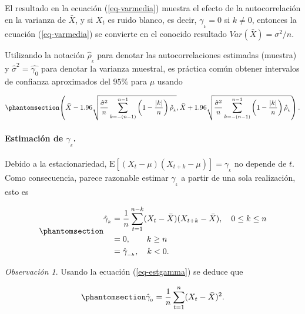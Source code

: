\documentclass[
  us-letterpaper,
]{scrreprt}
\let\oldparagraph\paragraph
\renewcommand{\paragraph}[1]{\oldparagraph{#1}\mbox{}}
\theoremstyle{plain}
\theoremstyle{definition}
\theoremstyle{definition}
\theoremstyle{plain}
\theoremstyle{remark}
\newtheorem*{remark}{Observación}
\begin{document}
El resultado en la ecuación (\ref{eq-varmedia}) muestra el efecto de la
autocorrelación en la varianza de \(\bar X\), y si \(X_t\) es ruido
blanco, es decir, \(\gamma_{_{k}} = 0\) si \(k \ne 0\), entonces la
ecuación (\ref{eq-varmedia}) se convierte en el conocido resultado
\(Var(\bar X) = \sigma^2/n\).

Utilizando la notación \(\hat \rho_{_k}\) para denotar las
autocorrelaciones estimadas (muestra) y \(\hat\sigma^2=\hat{\gamma_0}\)
para denotar la varianza muestral, es práctica común obtener intervalos
de confianza aproximados del \(95\%\) para \(\mu\) usando

\begin{equation}\phantomsection\label{eq-iconf}{
\left(\bar X- 1.96\sqrt{\frac{\hat\sigma^2}{n}\sum_{k=-(n-1)}^{n-1}\left(1-\frac{|k|}{n}\right)\hat\rho_{_k}}, \bar X+ 1.96\sqrt{\frac{\hat\sigma^2}{n}\sum_{k=-(n-1)}^{n-1}\left(1-\frac{|k|}{n}\right)\hat\rho_{_k}}\right).
}\end{equation}

\paragraph{\texorpdfstring{Estimación de
\(\gamma_{_k}\).}{Estimación de \textbackslash gamma\_\{\_k\}.}}\label{estimaciuxf3n-de-gamma__k.}

Debido a la estacionariedad,
\(\mathrm E[(X_t − \mu)(X_{t+k} − \mu)] = \gamma_{_k}\) no depende de
\(t.\) Como consecuencia, parece razonable estimar \(\gamma_{_k}\) a
partir de una sola realización, esto es

\begin{equation}\phantomsection\label{eq-estgamma}{
\begin{split}\hat{\gamma}_{_k}&= \frac{1}{n}\sum_{t=1}^{n-k}(X_t-\bar X)(X_{t+k}-\bar X), \quad 0\leq k\leq n\\
&=0,\qquad k\ge n\\
&=\hat{\gamma}_{_{-k}},\quad k<0.\end{split}
}\end{equation}

\begin{remark}
Usando la ecuación (\ref{eq-estgamma}) se deduce que

\begin{equation}\phantomsection\label{eq-hatgamma0}{
\hat{\gamma}_{_0}= \frac{1}{n}\sum_{t=1}^{n}(X_t-\bar X)^2.
}\end{equation}
\end{remark}
\end{document}
